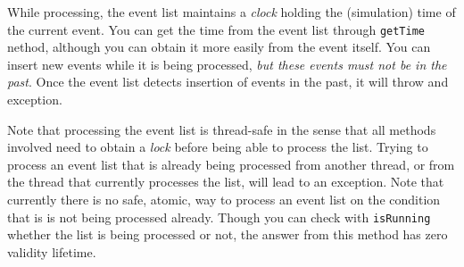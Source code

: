 \documentclass[12pt]{book}
\begin{document}
While processing, the event list maintains a {\em clock}
  holding the (simulation) time of the current event.
You can get the time from the event list through \lstinline{getTime} nethod,
  although you can obtain it more easily from the event itself.
You can insert new events while it is being processed,
  {\em but these events must not be in the past}.
Once the event list detects insertion of events in the past,
  it will throw and exception.

Note that processing the event list
  is thread-safe in the sense that all methods involved
  need to obtain a {\em lock} before being able to process the list.
Trying to process an event list that is already being processed
  from another thread,
  or from the thread that currently processes the list,
  will lead to an exception.
Note that currently there is no safe, atomic, way
  to process an event list on the condition that is
  is not being processed already.
Though you can check with \lstinline{isRunning}
  whether the list is being processed or not,
  the answer from this method has zero validity lifetime.
\end{document}
